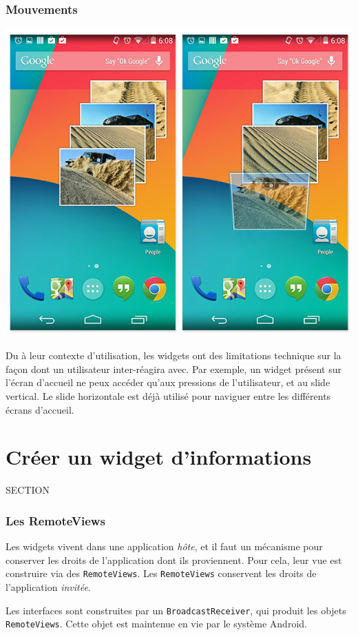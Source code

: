 \documentclass{beamer}
\begin{document}
\begin{frame}
\frametitle{Mouvements}
\begin{center}
\includegraphics[scale=0.2]{widgets_gestures.png}
\end{center}
Du à leur contexte d'utilisation, les widgets ont des limitations technique sur la façon dont un utilisateur inter-réagira avec. Par exemple, un widget présent sur l'écran d’accueil ne peux accéder qu'aux pressions de l'utilisateur, et au slide vertical. Le slide horizontale est déjà utilisé pour naviguer entre les différents écrans d’accueil.
\end{frame}

\section{Créer un widget d'informations}
\begin{frame}
SECTION
\end{frame}

\begin{frame}
\frametitle{Les RemoteViews}
\begin{block}{}
Les widgets vivent dans une application \emph{hôte}, et il faut un mécanisme pour conserver les droits de l'application dont ils proviennent. Pour cela, leur vue est construire via des \verb!RemoteViews!. Les \verb!RemoteViews! conservent les droits de l'application \emph{invitée}.
\end{block}

\begin{block}{}
Les interfaces sont construites par un \verb!BroadcastReceiver!, qui produit les objets \verb!RemoteViews!. Cette objet est maintenue en vie par le système Android.
\end{block}
\end{frame}
\end{document}
